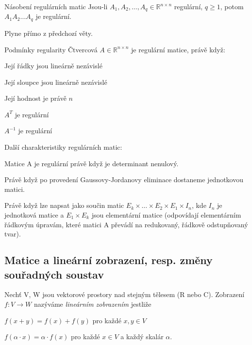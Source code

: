 \begin{vetaN}{Násobení regulárních matic}
Jsou-li $A_1,A_2,\dots,A_q \in \mathbb{R}^{n \times n}$ regulární, $q \ge 1$, potom $A_1 A_2 \dots A_q$ je regulární.

\medskip
\begin{dukaz}
Plyne přímo z předchozí věty.
\end{dukaz}
\end{vetaN}


\begin{poznamkaN}{Podmínky regularity}
Čtvercová $A \in \mathbb{R}^{n \times n}$ je regulární matice, právě když:
\begin{pitemize}
	\item Její řádky jsou lineárně nezávislé
	\item Její sloupce jsou lineárně nezávislé
	\item Její hodnost je právě $n$
	\item $A^{T}$ je regulární
	\item $A^{-1}$ je regulární
\end{pitemize}
\end{poznamkaN}

Další charakteristiky regulárních matic:
\begin{pitemize}
	\item Matice A je regulární právě když je determinant nenulový.
	\item Právě když po provedení Gaussovy-Jordanovy eliminace dostaneme jednotkovou matici.
	\item Právě když lze napsat jako součin matic $E_k \times \dots \times E_2 \times E_1 \times I_n$, kde $I_n$ je jednotková matice a $E_1 \times E_k$ jsou elementární matice (odpovídají elementárním řádkovým úpravám, které matici A převádí na redukovaný, řádkově odstupňovaný tvar).
\end{pitemize}

\subsection{Matice a lineární zobrazení, resp. změny souřadných soustav}

\begin{definice}
Nechť V, W jsou vektorové prostory nad stejným tělesem (R nebo C). Zobrazení $f: V \rightarrow W$ nazýváme \emph{lineárním zobrazením} jestliže
\begin{penumerate}
	\item $f(x+y)=f(x)+f(y)$ pro každé $x,y \in V$
	\item $f(\alpha\cdot x)=\alpha\cdot f(x)$ pro každé $x \in V$ a každý skalár $\alpha$.
\end{penumerate}
\end{definice}

